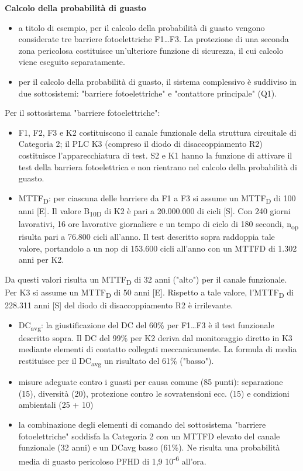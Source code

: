 \textbf{Calcolo della probabilità di guasto}
\begin{itemize}
    \item a titolo di esempio, per il calcolo della probabilità di guasto vengono considerate tre barriere fotoelettriche F1…F3. La protezione di una seconda zona pericolosa costituisce un'ulteriore funzione di sicurezza, il cui calcolo viene eseguito separatamente.
    \item per il calcolo della probabilità di guasto, il sistema complessivo è suddiviso in due sottosistemi: "barriere fotoelettriche" e "contattore principale" (Q1).
\end{itemize}

Per il sottosistema "barriere fotoelettriche":
\begin{itemize}
    \item F1, F2, F3 e K2 costituiscono il canale funzionale della struttura circuitale di Categoria 2; il PLC K3 (compreso il diodo di disaccoppiamento R2) costituisce l'apparecchiatura di test. S2 e K1 hanno la funzione di attivare il test della barriera fotoelettrica e non rientrano nel calcolo della probabilità di guasto.
    \item MTTF\textsubscript{D}: per ciascuna delle barriere da F1 a F3 si assume un MTTF\textsubscript{D} di 100 anni [E]. Il valore B\textsubscript{10D} di K2 è pari a 20.000.000 di cicli [S]. Con 240 giorni lavorativi, 16 ore lavorative giornaliere e un tempo di ciclo di 180 secondi, n\textsubscript{op} risulta pari a 76.800 cicli all'anno. Il test descritto sopra raddoppia tale valore, portandolo a un nop di 153.600 cicli all'anno con un MTTFD di 1.302 anni per K2.
\end{itemize}

Da questi valori risulta un MTTF\textsubscript{D} di 32 anni ("alto") per il canale funzionale. Per K3 si assume un MTTF\textsubscript{D} di 50 anni [E]. Rispetto a tale valore, l'MTTF\textsubscript{D} di 228.311 anni [S] del diodo di disaccoppiamento R2 è irrilevante.

\begin{itemize}
    \item DC\textsubscript{avg}: la giustificazione del DC del 60\% per F1…F3 è il test funzionale descritto sopra. Il DC del 99\% per K2 deriva dal monitoraggio diretto in K3 mediante elementi di contatto collegati meccanicamente. La formula di media restituisce per il DC\textsubscript{avg} un risultato del 61\% ("basso").
    \item misure adeguate contro i guasti per causa comune (85 punti): separazione (15), diversità (20), protezione contro le sovratensioni ecc. (15) e condizioni ambientali (25 + 10)
    \item la combinazione degli elementi di comando del sottosistema "barriere fotoelettriche" soddisfa la Categoria 2 con un MTTFD elevato del canale funzionale (32 anni) e un DCavg basso (61\%). Ne risulta una probabilità media di guasto pericoloso PFHD di 1,9 10\textsuperscript{-6} all'ora.
\end{itemize}


